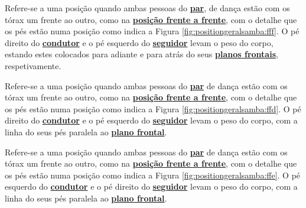 \begin{definition}
\label{def:fff-position}  
Refere-se a uma posição quando ambas pessoas do \hyperref[def:Par]{\textbf{par}}, 
de dança estão com os tórax um frente ao outro, 
como na \hyperref[def:frente-frente-position]{\textbf{posição frente a frente}},
com o detalhe que os pés estão numa posição como indica a Figura \ref{fig:positiongeralsamba:fff}.
O pé direito do \hyperref[def:Condutor]{\textbf{condutor}} e 
o pé esquerdo do \hyperref[def:Seguidor]{\textbf{seguidor}} levam o peso do corpo,
estando estes colocados para adiante e para atrás do seus \hyperref[def:PlanoFrontal]{\textbf{planos frontais}}, 
respetivamente.
\end{definition}

\begin{definition}
\label{def:ffd-position}  
Refere-se a uma posição quando ambas pessoas do \hyperref[def:Par]{\textbf{par}} 
de dança estão com os tórax um frente ao outro, 
como na \hyperref[def:frente-frente-position]{\textbf{posição frente a frente}},
com o detalhe que os pés estão numa posição como indica a Figura \ref{fig:positiongeralsamba:ffd}.
O pé direito do \hyperref[def:Condutor]{\textbf{condutor}} e 
o pé esquerdo do \hyperref[def:Seguidor]{\textbf{seguidor}} levam o peso do corpo,
com a linha do seus pés paralela ao \hyperref[def:PlanoFrontal]{\textbf{plano frontal}}.
\end{definition}


\begin{definition}
\label{def:ffe-position}  
Refere-se a uma posição quando ambas pessoas do \hyperref[def:Par]{\textbf{par}} 
de dança estão com os tórax um frente ao outro, 
como na \hyperref[def:frente-frente-position]{\textbf{posição frente a frente}},
com o detalhe que os pés estão numa posição como indica a Figura \ref{fig:positiongeralsamba:ffe}.
O pé esquerdo do \hyperref[def:Condutor]{\textbf{condutor}} e 
o pé direito do \hyperref[def:Seguidor]{\textbf{seguidor}} levam o peso do corpo,
com a linha do seus pés paralela ao \hyperref[def:PlanoFrontal]{\textbf{plano frontal}}.
\end{definition}


